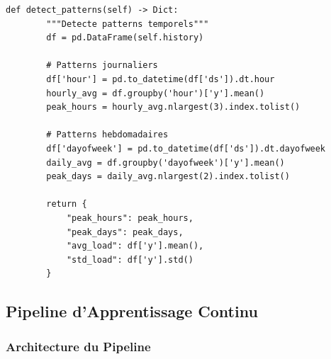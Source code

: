\documentclass[12pt,a4paper]{article}
\begin{document}
\begin{lstlisting}[caption={Load Prediction Engine}]
    def detect_patterns(self) -> Dict:
        """Detecte patterns temporels"""
        df = pd.DataFrame(self.history)
        
        # Patterns journaliers
        df['hour'] = pd.to_datetime(df['ds']).dt.hour
        hourly_avg = df.groupby('hour')['y'].mean()
        peak_hours = hourly_avg.nlargest(3).index.tolist()
        
        # Patterns hebdomadaires
        df['dayofweek'] = pd.to_datetime(df['ds']).dt.dayofweek
        daily_avg = df.groupby('dayofweek')['y'].mean()
        peak_days = daily_avg.nlargest(2).index.tolist()
        
        return {
            "peak_hours": peak_hours,
            "peak_days": peak_days,
            "avg_load": df['y'].mean(),
            "std_load": df['y'].std()
        }
\end{lstlisting}

\subsection{Pipeline d'Apprentissage Continu}

\subsubsection{Architecture du Pipeline}
\end{document}
